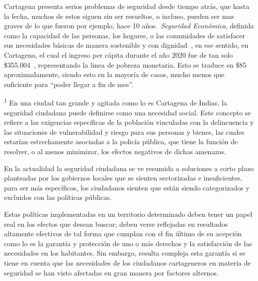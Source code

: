 \documentclass[letterpaper, 12pt]{article}
\newcommand{\cop}[1]{\$\SI{#1}{\COP}}
\newcommand{\dollar}[1]{\$\SI{#1}{\DOLLAR}}
\begin{document}

Cartagena presenta serios problemas de seguridad desde
tiempo atrás, que hasta la fecha, muchos de estos siguen
sin ser resueltos, o incluso, pueden ser mas graves de lo
que fueron por ejemplo, hace 10 años.~\textit{Seguridad
    Económica}, definida como la capacidad de las personas, los
hogares, o las comunidades de satisfacer sus necesidades
básicas de manera sostenible y con
dignidad~\cite{DeLaCruzRoja_2015}, en ese sentido, en
Cartagena, el cual el ingreso per cápita durante el año
2020 fue de tan solo \cop{355.004}~\cite{DANE_2021},
representando la linea de pobreza monetaria. Esto se
traduce en \dollar{85} aproximadamente, siendo esto en la
mayoría de casos, mucho menos que suficiente para ``poder
llegar a fin de mes''.


\textsuperscript{1} En una ciudad tan grande y agitada como
lo es Cartagena de Indias, la seguridad ciudadana puede definirse como una
necesidad social. Este concepto se refiere a las exigencias
específicas de la población vinculadas con la delincuencia
y las situaciones de vulnerabilidad y riesgo para sus
personas y bienes, las cuales estarían estrechamente
asociadas a la policía pública, que tiene la función de
resolver, o al menos minimizar, los efectos negativos de
dichas amenazas.


En la actualidad la seguridad ciudadana se ve resumida a
soluciones a corto plazo planteadas por los gobiernos
locales que se sienten sectorizadas e insuficientes, para
ser más específicos, los ciudadanos sienten que están
siendo categorizados y excluidos con las políticas
públicas.

Estas políticas implementadas en un territorio determinado
deben tener un papel real en los efectos que desean buscar;
deben verse reflejadas en resultados altamente efectivos de
tal forma que cumplan con el fin último de su acepción como
lo es la garantía y protección de uno o más derechos y la
satisfacción de las necesidades en los habitantes. Sin
embargo, resulta compleja esta garantía si se tiene en
cuenta que las necesidades de los ciudadanos cartageneros
en materia de seguridad se han visto afectadas en gran
manera por factores alternos.
\end{document}
